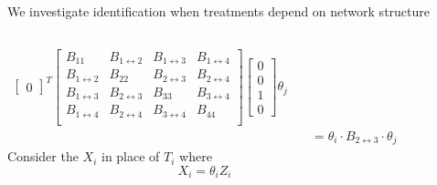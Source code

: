 \documentclass[aspectratio=169]{beamer}
\theoremstyle{remark}
\begin{document}
\begin{frame}{We investigate identification when treatments depend on network structure}
\begin{columns}
\begin{align*}
\begin{bmatrix}
                0 
            \end{bmatrix}^T
            \begin{bmatrix}
                B_{11}                  & B_{1 \leftrightarrow 2} & B_{1 \leftrightarrow 3} & B_{1 \leftrightarrow 4} \\
                B_{1 \leftrightarrow 2} & B_{22}                  & B_{2 \leftrightarrow 3} & B_{2 \leftrightarrow 4} \\
                B_{1 \leftrightarrow 3} & B_{2 \leftrightarrow 3} & B_{33}                  & B_{3 \leftrightarrow 4} \\
                B_{1 \leftrightarrow 4} & B_{2 \leftrightarrow 4} & B_{3 \leftrightarrow 4} & B_{44}                  \\
            \end{bmatrix}
            \begin{bmatrix}
                0 \\
                0 \\
                1 \\
                0 
            \end{bmatrix}
            \theta_j
            \\ 
             & \quad = \theta_i \cdot B_{2 \leftrightarrow 3} \cdot \theta_j
        \end{align*}
        Consider the $X_i$ in place of $T_i$ where
        \begin{equation*}
            X_i = \theta_i Z_i
        \end{equation*}
    \end{columns}
\end{frame}
\end{document}
